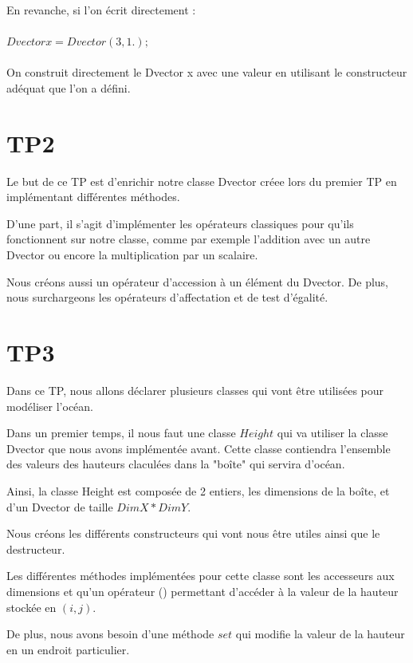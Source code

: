 \documentclass{article}
\begin{document}
En revanche, si l'on écrit directement : \\ \\ $Dvector x = Dvector(3, 1.);$ \\ \\

On construit directement le Dvector x avec une valeur en utilisant le constructeur adéquat que l'on a défini.


\vspace{1cm}

\section{TP2}

Le but de ce TP est d'enrichir notre classe Dvector créee lors du premier TP en implémentant différentes méthodes.

D'une part, il s'agit d'implémenter les opérateurs classiques pour qu'ils fonctionnent sur notre classe, comme par exemple l'addition avec un autre Dvector ou encore la multiplication par un scalaire.

Nous créons aussi un opérateur d'accession à un élément du Dvector. De plus, nous surchargeons les opérateurs d'affectation et de test d'égalité.

\vspace{1cm}

\section{TP3}

Dans ce TP, nous allons déclarer plusieurs classes qui vont être utilisées pour modéliser l'océan.

Dans un premier temps, il nous faut une classe $Height$ qui va utiliser la classe Dvector que nous avons implémentée avant. Cette classe contiendra l'ensemble des valeurs des hauteurs claculées dans la "boîte" qui servira d'océan.

Ainsi, la classe Height est composée de 2 entiers, les dimensions de la boîte, et d'un Dvector de taille $DimX * DimY$.

Nous créons les différents constructeurs qui vont nous être utiles ainsi que le destructeur.

Les différentes méthodes implémentées pour cette classe sont les accesseurs aux dimensions et qu'un opérateur () permettant d'accéder à la valeur de la hauteur stockée en $(i,j)$.

De plus, nous avons besoin d'une méthode $set$ qui modifie la valeur de la hauteur en un endroit particulier.
\end{document}
